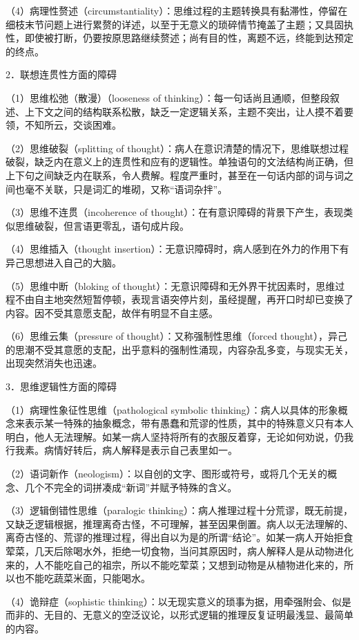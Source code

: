 （4）病理性赘述（circumstantiality）：思维过程的主题转换具有黏滞性，停留在细枝末节问题上进行累赘的详述，以至于无意义的琐碎情节掩盖了主题；又具固执性，即使被打断，仍要按原思路继续赘述；尚有目的性，离题不远，终能到达预定的终点。

2．联想连贯性方面的障碍

（1）思维松弛（散漫）（looseness of
thinking）：每一句话尚且通顺，但整段叙述、上下文之间的结构联系松散，缺乏一定逻辑关系，主题不突出，让人摸不着要领，不知所云，交谈困难。

（2）思维破裂（splitting of
thought）：病人在意识清楚的情况下，思维联想过程破裂，缺乏内在意义上的连贯性和应有的逻辑性。单独语句的文法结构尚正确，但上下句之间缺乏内在联系，令人费解。程度严重时，甚至在一句话内部的词与词之间也毫不关联，只是词汇的堆砌，又称``语词杂拌''。

（3）思维不连贯（incoherence of
thought）：在有意识障碍的背景下产生，表现类似思维破裂，但言语更零乱，语句成片段。

（4）思维插入（thought
insertion）：无意识障碍时，病人感到在外力的作用下有异己思想进入自己的大脑。

（5）思维中断（bloking of
thought）：无意识障碍和无外界干扰因素时，思维过程不由自主地突然短暂停顿，表现言语突停片刻，虽经提醒，再开口时却已变换了内容。因不受其意愿支配，故伴有明显不自主感。

（6）思维云集（pressure of thought）：又称强制性思维（forced
thought），异己的思潮不受其意愿的支配，出乎意料的强制性涌现，内容杂乱多变，与现实无关，出现突然消失也迅速。

3．思维逻辑性方面的障碍

（1）病理性象征性思维（pathological symbolic
thinking）：病人以具体的形象概念来表示某一特殊的抽象概念，带有愚蠢和荒谬的性质，其中的特殊意义只有本人明白，他人无法理解。如某一病人坚持将所有的衣服反着穿，无论如何劝说，仍我行我素。病情好转后，病人解释是表示自己表里如一。

（2）语词新作（neologism）：以自创的文字、图形或符号，或将几个无关的概念、几个不完全的词拼凑成``新词''并赋予特殊的含义。

（3）逻辑倒错性思维（paralogic
thinking）：病人推理过程十分荒谬，既无前提，又缺乏逻辑根据，推理离奇古怪，不可理解，甚至因果倒置。病人以无法理解的、离奇古怪的、荒谬的推理过程，得出自以为是的所谓``结论''。如某一病人开始拒食荤菜，几天后除喝水外，拒绝一切食物，当问其原因时，病人解释人是从动物进化来的，人不能吃自己的祖宗，所以不能吃荤菜；又想到动物是从植物进化来的，所以也不能吃蔬菜米面，只能喝水。

（4）诡辩症（sophistic
thinking）：以无现实意义的琐事为据，用牵强附会、似是而非的、无目的、无意义的空泛议论，以形式逻辑的推理反复证明最浅显、最简单的内容。

